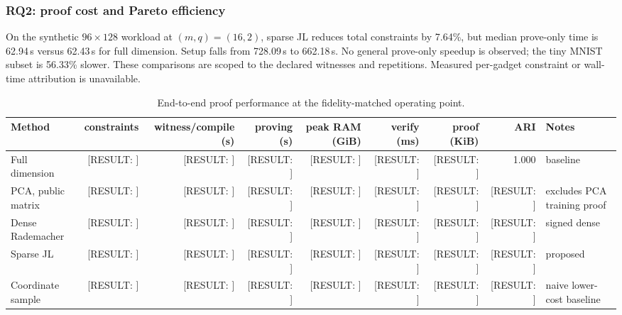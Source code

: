 \documentclass[pdflatex,sn-mathphys-num,iicol]{sn-jnl}
\newcommand{\resultplaceholder}[1]{\textcolor{red!75!black}{[RESULT: #1]}}
\newcommand{\tpexplain}[1]{}
\theoremstyle{plain}
\theoremstyle{definition}
\theoremstyle{remark}
\begin{document}
\subsubsection{RQ2: proof cost and Pareto efficiency}
\tpexplain{Lead with actual wall-clock and memory, then explain constraint counts. Show absolute values as well as speedups.}
On the synthetic $96\times128$ workload at $(m,q)=(16,2)$, sparse JL reduces total constraints by 7.64\%, but median prove-only time is 62.94\,s versus 62.43\,s for full dimension. Setup falls from 728.09\,s to 662.18\,s. No general prove-only speedup is observed; the tiny MNIST subset is 56.33\% slower. These comparisons are scoped to the declared witnesses and repetitions. Measured per-gadget constraint or wall-time attribution is unavailable.

\begin{table}[!htbp]
\caption{End-to-end proof performance at the fidelity-matched operating point.}\label{tab:zkperf-a}
\centering\scriptsize
\begin{adjustbox}{max width=\textwidth}
\begin{tabularx}{\textwidth}{@{}Y R R R R R R R Y@{}}
\toprule
Method & constraints & witness/compile (s) & proving (s) & peak RAM (GiB) & verify (ms) & proof (KiB) & ARI & Notes \\
\midrule
Full dimension & \resultplaceholder{} & \resultplaceholder{} & \resultplaceholder{} & \resultplaceholder{} & \resultplaceholder{} & \resultplaceholder{} & 1.000 & baseline \\
PCA, public matrix & \resultplaceholder{} & \resultplaceholder{} & \resultplaceholder{} & \resultplaceholder{} & \resultplaceholder{} & \resultplaceholder{} & \resultplaceholder{} & excludes PCA training proof \\
Dense Rade\-macher & \resultplaceholder{} & \resultplaceholder{} & \resultplaceholder{} & \resultplaceholder{} & \resultplaceholder{} & \resultplaceholder{} & \resultplaceholder{} & signed dense \\
Sparse JL & \resultplaceholder{} & \resultplaceholder{} & \resultplaceholder{} & \resultplaceholder{} & \resultplaceholder{} & \resultplaceholder{} & \resultplaceholder{} & proposed \\
Coordinate sample & \resultplaceholder{} & \resultplaceholder{} & \resultplaceholder{} & \resultplaceholder{} & \resultplaceholder{} & \resultplaceholder{} & \resultplaceholder{} & naive lower-cost baseline \\
\bottomrule
\end{tabularx}
\end{adjustbox}
\end{table}
\end{document}
